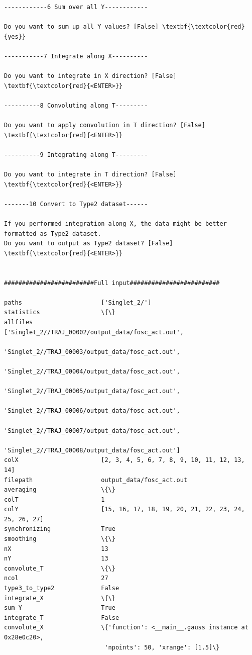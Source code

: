 \documentclass[a4paper,11pt,DIV=15,openany]{scrbook}
\begin{document}
\begin{oframed}
\begin{Verbatim}[commandchars=\\\{\}]
------------6 Sum over all Y------------

Do you want to sum up all Y values? [False] \textbf{\textcolor{red}{yes}}

-----------7 Integrate along X----------

Do you want to integrate in X direction? [False] \textbf{\textcolor{red}{<ENTER>}}

----------8 Convoluting along T---------

Do you want to apply convolution in T direction? [False] \textbf{\textcolor{red}{<ENTER>}}

----------9 Integrating along T---------

Do you want to integrate in T direction? [False] \textbf{\textcolor{red}{<ENTER>}}

-------10 Convert to Type2 dataset------

If you performed integration along X, the data might be better formatted as Type2 dataset.
Do you want to output as Type2 dataset? [False] \textbf{\textcolor{red}{<ENTER>}}


#########################Full input#########################

paths                      ['Singlet_2/']
statistics                 \{\}
allfiles                   ['Singlet_2//TRAJ_00002/output_data/fosc_act.out',
                            'Singlet_2//TRAJ_00003/output_data/fosc_act.out',
                            'Singlet_2//TRAJ_00004/output_data/fosc_act.out',
                            'Singlet_2//TRAJ_00005/output_data/fosc_act.out',
                            'Singlet_2//TRAJ_00006/output_data/fosc_act.out',
                            'Singlet_2//TRAJ_00007/output_data/fosc_act.out',
                            'Singlet_2//TRAJ_00008/output_data/fosc_act.out']
colX                       [2, 3, 4, 5, 6, 7, 8, 9, 10, 11, 12, 13, 14]
filepath                   output_data/fosc_act.out
averaging                  \{\}
colT                       1
colY                       [15, 16, 17, 18, 19, 20, 21, 22, 23, 24, 25, 26, 27]
synchronizing              True
smoothing                  \{\}
nX                         13
nY                         13
convolute_T                \{\}
ncol                       27
type3_to_type2             False
integrate_X                \{\}
sum_Y                      True
integrate_T                False
convolute_X                \{'function': <__main__.gauss instance at 0x28e0c20>, 
                            'npoints': 50, 'xrange': [1.5]\}


\end{Verbatim}
\end{oframed}
\end{document}
